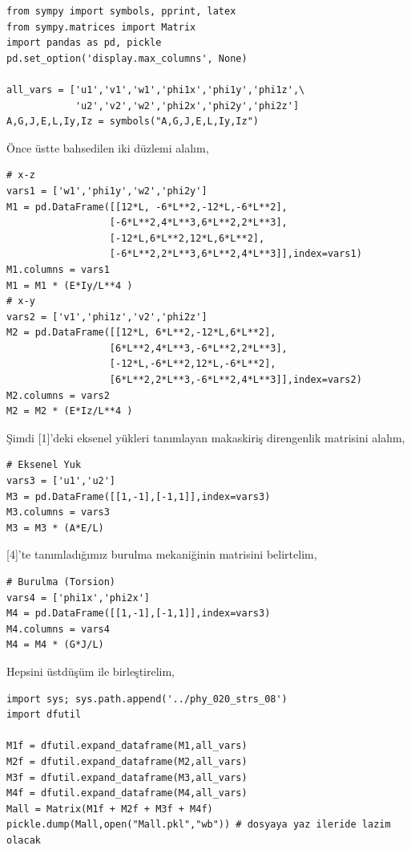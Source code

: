 \documentclass[12pt,fleqn]{article}\usepackage{../../common}
\begin{document}
\begin{verbatim}
from sympy import symbols, pprint, latex
from sympy.matrices import Matrix
import pandas as pd, pickle
pd.set_option('display.max_columns', None)

all_vars = ['u1','v1','w1','phi1x','phi1y','phi1z',\
            'u2','v2','w2','phi2x','phi2y','phi2z']
A,G,J,E,L,Iy,Iz = symbols("A,G,J,E,L,Iy,Iz")
\end{verbatim}

Önce üstte bahsedilen iki düzlemi alalım,

\begin{verbatim}
# x-z
vars1 = ['w1','phi1y','w2','phi2y']
M1 = pd.DataFrame([[12*L, -6*L**2,-12*L,-6*L**2],
                  [-6*L**2,4*L**3,6*L**2,2*L**3],
                  [-12*L,6*L**2,12*L,6*L**2],
                  [-6*L**2,2*L**3,6*L**2,4*L**3]],index=vars1)
M1.columns = vars1
M1 = M1 * (E*Iy/L**4 )
# x-y
vars2 = ['v1','phi1z','v2','phi2z']
M2 = pd.DataFrame([[12*L, 6*L**2,-12*L,6*L**2],
                  [6*L**2,4*L**3,-6*L**2,2*L**3],
                  [-12*L,-6*L**2,12*L,-6*L**2],
                  [6*L**2,2*L**3,-6*L**2,4*L**3]],index=vars2)
M2.columns = vars2
M2 = M2 * (E*Iz/L**4 )
\end{verbatim}

Şimdi [1]'deki eksenel yükleri tanımlayan makaskiriş direngenlik matrisini
alalım,

\begin{verbatim}
# Eksenel Yuk
vars3 = ['u1','u2']
M3 = pd.DataFrame([[1,-1],[-1,1]],index=vars3)
M3.columns = vars3
M3 = M3 * (A*E/L)
\end{verbatim}

[4]'te tanımladığımız burulma mekaniğinin matrisini belirtelim,

\begin{verbatim}
# Burulma (Torsion)
vars4 = ['phi1x','phi2x']
M4 = pd.DataFrame([[1,-1],[-1,1]],index=vars3)
M4.columns = vars4
M4 = M4 * (G*J/L)
\end{verbatim}

Hepsini üstdüşüm ile birleştirelim,

\begin{verbatim}
import sys; sys.path.append('../phy_020_strs_08')
import dfutil

M1f = dfutil.expand_dataframe(M1,all_vars)
M2f = dfutil.expand_dataframe(M2,all_vars)
M3f = dfutil.expand_dataframe(M3,all_vars)
M4f = dfutil.expand_dataframe(M4,all_vars)
Mall = Matrix(M1f + M2f + M3f + M4f)
pickle.dump(Mall,open("Mall.pkl","wb")) # dosyaya yaz ileride lazim olacak
\end{verbatim}
\end{document}
